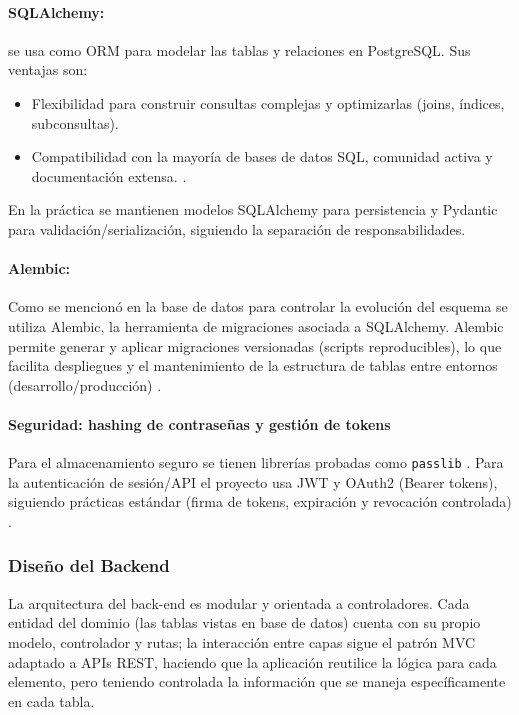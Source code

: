 \documentclass[12pt, a4paper]{article}
\begin{document}
\paragraph{SQLAlchemy:} se usa como ORM para modelar las tablas y relaciones en PostgreSQL. Sus ventajas son:
\begin{itemize}
	\item Flexibilidad para construir consultas complejas y optimizarlas (joins, índices, subconsultas).
	\item Compatibilidad con la mayoría de bases de datos SQL, comunidad activa y documentación extensa. \cite{SQLAlchemy}.
\end{itemize}
En la práctica se mantienen modelos SQLAlchemy para persistencia y Pydantic para validación/serialización, siguiendo la separación de responsabilidades.

\paragraph{Alembic:}
Como se mencionó en la base de datos para controlar la evolución del esquema se utiliza Alembic, la herramienta de migraciones asociada a SQLAlchemy. Alembic permite generar y aplicar migraciones versionadas (scripts reproducibles), lo que facilita despliegues y el mantenimiento de la estructura de tablas entre entornos (desarrollo/producción) \cite{Alembic}.

\paragraph{Seguridad: hashing de contraseñas y gestión de tokens}
Para el almacenamiento seguro se tienen librerías probadas como \texttt{passlib} \cite{Passlib}. Para la autenticación de sesión/API el proyecto usa JWT y OAuth2 (Bearer tokens), siguiendo prácticas estándar (firma de tokens, expiración y revocación controlada) \cite{JWT}. 


\subsubsection{Diseño del Backend}

La arquitectura del back-end es modular y orientada a controladores. Cada entidad del dominio (las tablas vistas en base de datos) cuenta con su propio modelo, controlador y rutas; la interacción entre capas sigue el patrón MVC adaptado a APIs REST, haciendo que la aplicación reutilice la lógica para cada elemento, pero teniendo controlada la información que se maneja específicamente en cada tabla.
\end{document}
